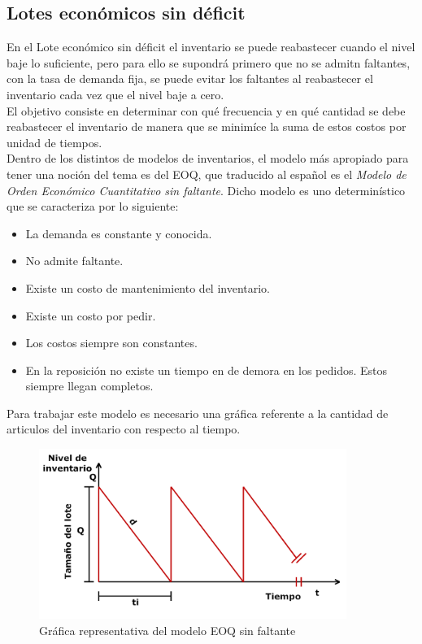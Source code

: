 \documentclass[letterpaper, 12pt]{article}
\begin{document}
    \subsection{Lotes económicos sin déficit}
    \justify
    En el Lote económico sin déficit el inventario se puede reabastecer cuando el nivel baje lo suficiente, pero para ello se supondrá primero que no se admitn faltantes, con la tasa de demanda fija, se puede evitar los faltantes al reabastecer
    el inventario cada vez que el nivel baje a cero.
    \\\newline
    El objetivo consiste en determinar con qué frecuencia y en qué cantidad se debe reabastecer el inventario de manera que se minimíce la suma de estos costos por unidad de tiempos.
    \\\newline
    Dentro de los distintos de modelos de inventarios, el modelo más apropiado para tener una noción del tema es del EOQ, que traducido al español es el \emph{Modelo de Orden Económico Cuantitativo sin faltante}. Dicho modelo es uno determinístico que
    se caracteriza por lo siguiente:
    \begin{itemize}
        \item La demanda es constante y conocida.
        \item No admite faltante.
        \item Existe un costo de mantenimiento del inventario.
        \item Existe un costo por pedir.
        \item Los costos siempre son constantes.
        \item En la reposición no existe un tiempo en de demora en los pedidos. Estos siempre llegan completos.
    \end{itemize}
    Para trabajar este modelo es necesario una gráfica referente a la cantidad de articulos del inventario con respecto al tiempo.
    \begin{figure}[H]
        \centering
        \includegraphics[width=10cm]{graficaeoq.png}
        \caption{Gráfica representativa del modelo EOQ sin faltante}
    \end{figure}
\end{document}
